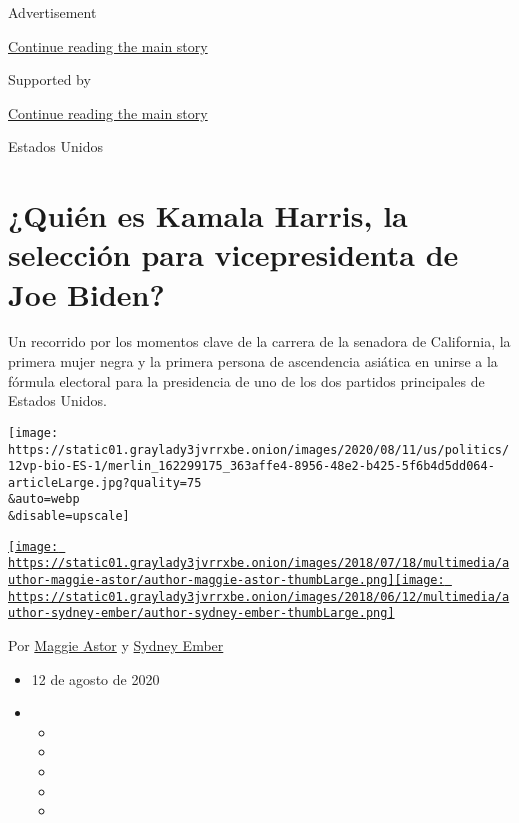 Advertisement

\protect\hyperlink{after-top}{Continue reading the main story}

Supported by

\protect\hyperlink{after-sponsor}{Continue reading the main story}

Estados Unidos

\hypertarget{quiuxe9n-es-kamala-harris-la-selecciuxf3n-para-vicepresidenta-de-joe-biden}{%
\section{¿Quién es Kamala Harris, la selección para vicepresidenta de
Joe
Biden?}\label{quiuxe9n-es-kamala-harris-la-selecciuxf3n-para-vicepresidenta-de-joe-biden}}

Un recorrido por los momentos clave de la carrera de la senadora de
California, la primera mujer negra y la primera persona de ascendencia
asiática en unirse a la fórmula electoral para la presidencia de uno de
los dos partidos principales de Estados Unidos.

\texttt{[image: https://static01.graylady3jvrrxbe.onion/images/2020/08/11/us/politics/12vp-bio-ES-1/merlin\_162299175\_363affe4-8956-48e2-b425-5f6b4d5dd064-articleLarge.jpg?quality=75\\\&auto=webp\\\&disable=upscale]}

\href{https://www.nytimes3xbfgragh.onion/by/maggie-astor}{\texttt{[image: https://static01.graylady3jvrrxbe.onion/images/2018/07/18/multimedia/author-maggie-astor/author-maggie-astor-thumbLarge.png]}}\href{https://www.nytimes3xbfgragh.onion/by/sydney-ember}{\texttt{[image: https://static01.graylady3jvrrxbe.onion/images/2018/06/12/multimedia/author-sydney-ember/author-sydney-ember-thumbLarge.png]}}

Por \href{https://www.nytimes3xbfgragh.onion/by/maggie-astor}{Maggie
Astor} y
\href{https://www.nytimes3xbfgragh.onion/by/sydney-ember}{Sydney Ember}

\begin{itemize}
\item
  12 de agosto de 2020
\item
  \begin{itemize}
  \item
  \item
  \item
  \item
  \item
  \end{itemize}
\end{itemize}

